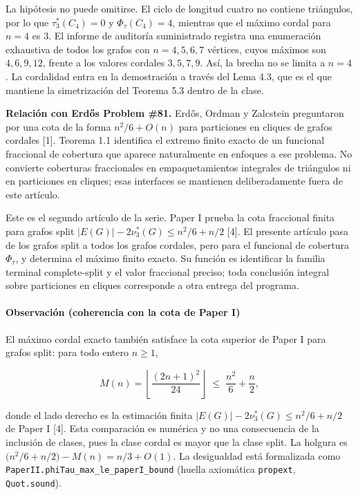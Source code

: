 \documentclass[
  spanish,
  11pt,
  a4paper,
]{article}
\begin{document}
La hipótesis no puede omitirse. El ciclo de longitud cuatro no contiene triángulos, por lo que \(\tau_3^*(C_4)=0\) y \(\Phi_\tau(C_4)=4\), mientras que el máximo cordal para \(n=4\) es \(3\). El informe de auditoría suministrado registra una enumeración exhaustiva de todos los grafos con \(n=4,5,6,7\) vértices, cuyos máximos son \(4,6,9,12\), frente a los valores cordales \(3,5,7,9\). Así, la brecha no se limita a \(n=4\). La cordalidad entra en la demostración a través del Lema 4.3, que es el que mantiene la simetrización del Teorema 5.3 dentro de la clase.

\textbf{Relación con Erdős Problem \#81.} Erdős, Ordman y Zalcstein preguntaron por una cota de la forma \(n^2/6+O(n)\) para particiones en cliques de grafos cordales {[}1{]}. Teorema 1.1 identifica el extremo finito exacto de un funcional fraccional de cobertura que aparece naturalmente en enfoques a ese problema. No convierte coberturas fraccionales en empaquetamientos integrales de triángulos ni en particiones en cliques; esas interfaces se mantienen deliberadamente fuera de este artículo.

Este es el segundo artículo de la serie. Paper I prueba la cota fraccional finita para grafos split \(|E(G)|-2\nu_3^*(G)\le n^2/6+n/2\) {[}4{]}. El presente artículo pasa de los grafos split a todos los grafos cordales, pero para el funcional de cobertura \(\Phi_\tau\), y determina el máximo finito exacto. Su función es identificar la familia terminal complete-split y el valor fraccional preciso; toda conclusión integral sobre particiones en cliques corresponde a otra entrega del programa.

\paragraph{Observación (coherencia con la cota de Paper I)}\label{observaciuxf3n-coherencia-con-la-cota-de-paper-i}

El máximo cordal exacto también satisface la cota superior de Paper I para grafos split: para todo entero \(n\ge1\),

\[
M(n)=\left\lfloor\frac{(2n+1)^2}{24}\right\rfloor
\;\le\;
\frac{n^2}{6}+\frac{n}{2},
\]

donde el lado derecho es la estimación finita \(|E(G)|-2\nu_3^*(G)\le n^2/6+n/2\) de Paper I {[}4{]}. Esta comparación es numérica y no una consecuencia de la inclusión de clases, pues la clase cordal es mayor que la clase split. La holgura es \(\bigl(n^2/6+n/2\bigr)-M(n)=n/3+O(1)\). La desigualdad está formalizada como \texttt{PaperII.phiTau\_max\_le\_paperI\_bound} (huella axiomática \texttt{propext}, \texttt{Quot.sound}).
\end{document}
